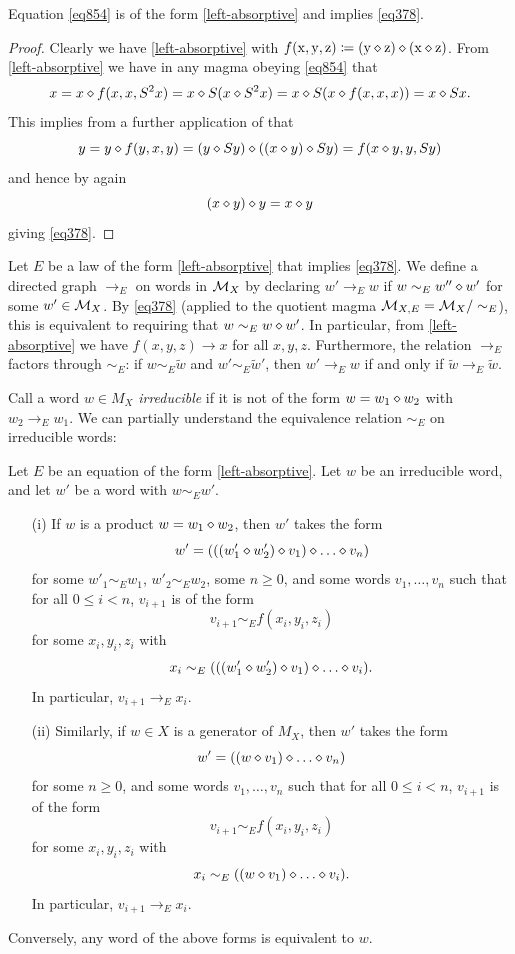 \begin{lemma}\label{854} Equation \eqref{eq854} is of the form \eqref{left-absorptive} and implies \eqref{eq378}.
\end{lemma}

\begin{proof}  Clearly we have \eqref{left-absorptive} with $f(\mathrm{x},\mathrm{y},\mathrm{z}) \coloneqq (\mathrm{y} \diamond \mathrm{z}) \diamond (\mathrm{x} \diamond \mathrm{z})$.  From \ref{left-absorptive} we have in any magma obeying \eqref{eq854} that
$$x = x \diamond f(x,x,S^2 x) = x \diamond S(x \diamond S^2 x) = x \diamond S(x \diamond f(x,x,x)) = x \diamond Sx.$$
This implies from a further application of  that
$$ y = y \diamond f(y,x,y) = (y \diamond Sy) \diamond ((x \diamond y) \diamond Sy) = f(x \diamond y, y, Sy)$$
and hence by  again
$$ (x \diamond y) \diamond y = x \diamond y$$
giving \eqref{eq378}.
\end{proof}

Let $E$ be a law of the form \eqref{left-absorptive} that implies \eqref{eq378}. We define a directed graph $\to_E$ on words in ${\mathcal{M}}_X$ by declaring $w' \to_E w$ if $w \sim_E w'' \diamond w'$ for some $w' \in {\mathcal{M}}_X$.  By \eqref{eq378} (applied to the quotient magma ${\mathcal{M}}_{X,E} = {\mathcal{M}}_X/\sim_E$), this is equivalent to requiring that $w \sim_E w \diamond w'$. In particular, from \eqref{left-absorptive} we have $f(x,y,z) \to x$ for all $x,y,z$.  Furthermore, the relation $\to_E$ factors through $\sim_E$: if $w \sim_E \tilde w$ and $w' \sim_E \tilde w'$, then $w' \to_E w$ if and only if $\tilde w \to_E \tilde w$.

Call a word $w \in M_X$ \emph{irreducible} if it is not of the form $w = w_1 \diamond w_2$ with $w_2 \to_E w_1$.  We can partially understand the equivalence relation $\sim_E$ on irreducible words:

\begin{theorem}\label{irred-desc}  Let $E$ be an equation of the form \eqref{left-absorptive}.  Let $w$ be an irreducible word, and let $w'$ be a word with $w \sim_E w'$.
  \begin{itemize}
    \item[(i)] If $w$ is a product $w = w_1 \diamond w_2$, then $w'$ takes the form
$$ w' = (((w'_1 \op w'_2) \op v_1) \op \dots \op v_n)$$
for some $w'_1 \sim_E w_1$, $w'_2 \sim_E w_2$, some $n \geq 0$, and some words $v_1, \dots, v_n$ such that for all $0 \leq i < n$, $v_{i+1}$ is of the form
$$ v_{i+1} \sim_E f(x_i,y_i,z_i)$$
for some $x_i, y_i, z_i$ with
$$ x_i \sim_E (((w'_1 \op w'_2) \op v_1) \op \dots \op v_i).$$
In particular, $v_{i+1} \to_E x_i$.
  \item[(ii)] Similarly, if $w \in X$ is a generator of $M_X$, then $w'$ takes the form
$$ w' = ((w \op v_1) \op \dots \op v_n)$$
for some $n \geq 0$, and some words $v_1, \dots, v_n$ such that for all $0 \leq i < n$, $v_{i+1}$ is of the form
$$ v_{i+1} \sim_E f(x_i,y_i,z_i)$$
for some $x_i, y_i, z_i$ with
$$ x_i \sim_E ((w \op v_1) \op \dots \op v_i).$$
In particular, $v_{i+1} \to_E x_i$.
\end{itemize}
Conversely, any word of the above forms is equivalent to $w$.
\end{theorem}

